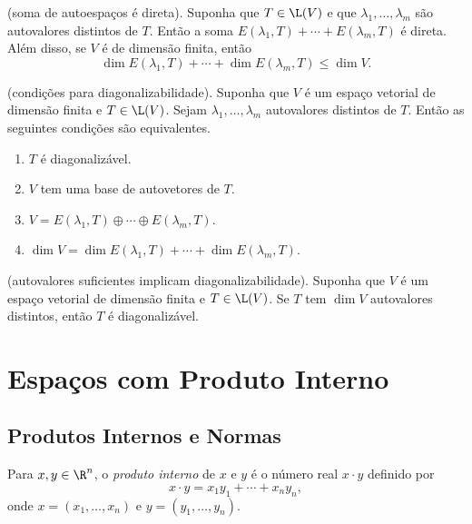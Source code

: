 \documentclass{article}
\begin{document}
\begin{prop} (soma de autoespaços é direta).
    Suponha que \(T \in \L(V)\) e que \(\lambda_1, \ldots, \lambda_m\) são autovalores distintos de \(T\). Então a soma \(E(\lambda_1, T) + \cdots + E(\lambda_m, T)\) é direta. Além disso, se \(V\) é de dimensão finita, então
    \[
        \dim E(\lambda_1, T) + \cdots + \dim E(\lambda_m, T) \leq \dim V.
    \]
\end{prop}

\begin{thm} (condições para diagonalizabilidade).
    Suponha que \(V\) é um espaço vetorial de dimensão finita e \(T \in \L(V)\). Sejam \(\lambda_1,\ldots,\lambda_m\) autovalores distintos de \(T\). Então as seguintes condições são equivalentes.
    \begin{enumerate}
        \item[(a)] \(T\) é diagonalizável.
        \item[(b)] \(V\) tem uma base de autovetores de \(T\).
        \item[(c)] \(V = E(\lambda_1, T) \oplus \cdots \oplus E(\lambda_m, T)\).
        \item[(d)] \(\dim V = \dim E(\lambda_1, T) + \cdots + \dim E(\lambda_m, T)\).
    \end{enumerate}
\end{thm}

\begin{prop} (autovalores suficientes implicam diagonalizabilidade).
    Suponha que \(V\) é um espaço vetorial de dimensão finita e \(T \in \L(V)\). Se \(T\) tem \(\dim V\) autovalores distintos, então \(T\) é diagonalizável.
\end{prop}

\section{Espaços com Produto Interno}
\subsection{Produtos Internos e Normas}

\begin{defn}
    Para \(x, y \in \R^n\), o \emph{produto interno} de \(x\) e \(y\) é o número real \(x \cdot y\) definido por
    \[
        x \cdot y = x_1 y_1 + \cdots + x_n y_n,
    \]
    \noindent onde \(x = (x_1, \ldots, x_n)\) e \(y = (y_1, \ldots, y_n)\).
\end{defn}
\end{document}
